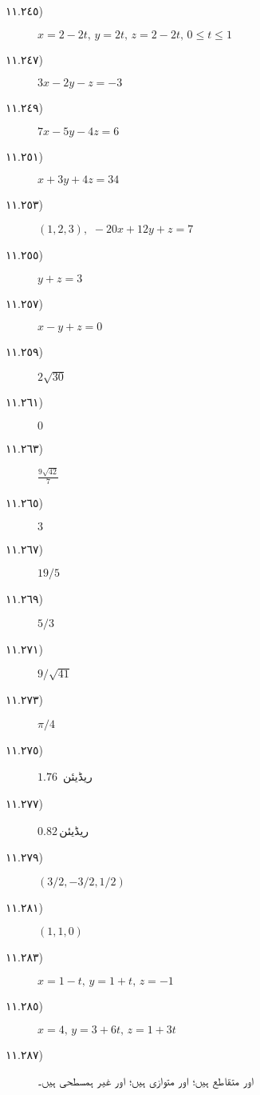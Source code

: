 \begin {description}
\item [
\protect ١١.\protect ٢٤٥)
]
$x=2-2t,\,y=2t,\,z=2-2t,\,0\le t\le 1$
 \begin {center}  \end {center} 
\item [
\protect ١١.\protect ٢٤٧)
]
$3x-2y-z=-3$
\item [
\protect ١١.\protect ٢٤٩)
]
$7x-5y-4z=6$
\item [
\protect ١١.\protect ٢٥١)
]
$x+3y+4z=34$
\item [
\protect ١١.\protect ٢٥٣)
]
$(1,2,3),\,\, -20x+12y+z=7$
\item [
\protect ١١.\protect ٢٥٥)
]
$y+z=3$
\item [
\protect ١١.\protect ٢٥٧)
]
$x-y+z=0$
\item [
\protect ١١.\protect ٢٥٩)
]
$2\sqrt {30}$
\item [
\protect ١١.\protect ٢٦١)
]
$0$
\item [
\protect ١١.\protect ٢٦٣)
]
$\tfrac {9\sqrt {42}}{7}$
\item [
\protect ١١.\protect ٢٦٥)
]
$3$
\item [
\protect ١١.\protect ٢٦٧)
]
$19/5$
\item [
\protect ١١.\protect ٢٦٩)
]
$5/3$
\item [
\protect ١١.\protect ٢٧١)
]
$9/\sqrt {41}$
\item [
\protect ١١.\protect ٢٧٣)
]
$\pi /4$
\item [
\protect ١١.\protect ٢٧٥)
]
$1.76$\, ریڈیئن
\item [
\protect ١١.\protect ٢٧٧)
]
$0.82$\,ریڈیئن
\item [
\protect ١١.\protect ٢٧٩)
]
$(3/2,-3/2,1/2)$
\item [
\protect ١١.\protect ٢٨١)
]
$(1,1,0)$
\item [
\protect ١١.\protect ٢٨٣)
]
$x=1-t,\,y=1+t,\,z=-1$
\item [
\protect ١١.\protect ٢٨٥)
]
$x=4,\,y=3+6t,\,z=1+3t$
\item [
\protect ١١.\protect ٢٨٧)
]
  اور  متقاطع ہیں؛  اور  متوازی ہیں؛  اور  غیر ہمسطحی ہیں۔ 

\end{description}
